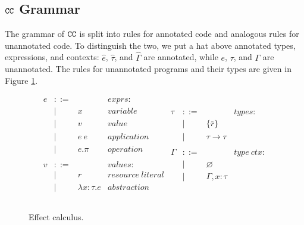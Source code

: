 \subsection{$\mathtt{CC}$ Grammar}

The grammar of $\mathtt{CC}$ is split into rules for annotated code and analogous rules for unannotated code. To distinguish the two, we put a hat above annotated types, expressions, and contexts: $\hat e$, $\hat \tau$, and $\hat \Gamma$ are annotated, while $e$, $\tau$, and $\Gamma$ are unannotated. The rules for unannotated programs and their types are given in Figure \ref{fig:epscalc_unannotated_grammar}.

\begin{figure}[h]
\vspace{-5pt}

\[
\begin{array}{lll}

\begin{array}{lllr}
e & ::= & ~ & exprs: \\
	& | & x & variable \\
	& | & v & value \\
	& | & e ~ e & application \\
	& | & e.\pi & operation \\
	&&\\

v & ::= & ~ & values: \\
	& | & r & resource~literal \\
	& | & \lambda x: \tau.e & abstraction \\
	&&\\
\end{array}

\begin{array}{lllr}

\tau & ::= & ~ & types: \\
		& | & \{ \bar r \} \\
		& | & \tau \rightarrow \tau \\ 
		&&\\

\Gamma & ::= & ~ & type~ctx: \\
				& | & \varnothing \\
				& | & \Gamma, x: \tau \\
				&&\\
				
\end{array}

\end{array}
\]

\vspace{-7pt}
\caption{Effect calculus.}
\label{fig:epscalc_unannotated_grammar}
\end{figure}

